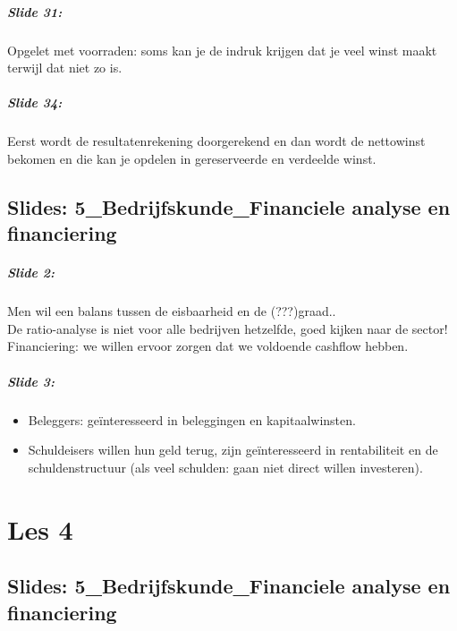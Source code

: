 \documentclass[10pt,a4paper]{report}
\begin{document}
\paragraph{Slide 31:} Opgelet met voorraden: soms kan je de indruk krijgen dat je veel winst maakt terwijl dat niet zo is.

\paragraph{Slide 34:} Eerst wordt de resultatenrekening doorgerekend en dan wordt de nettowinst bekomen en die kan je opdelen in gereserveerde en verdeelde winst.

\section{Slides: 5\_Bedrijfskunde\_Financiele analyse en financiering}

\paragraph{Slide 2:} Men wil een balans tussen de eisbaarheid en de (???)graad..\\
De ratio-analyse is niet voor alle bedrijven hetzelfde, goed kijken naar de sector!\\
Financiering: we willen ervoor zorgen dat we voldoende cashflow hebben.

\paragraph{Slide 3: }
\begin{itemize}
\item Beleggers: ge\"interesseerd in beleggingen en kapitaalwinsten.
\item Schuldeisers willen hun geld terug, zijn ge\"interesseerd in rentabiliteit en de schuldenstructuur (als veel schulden: gaan niet direct willen investeren).
\end{itemize}

\chapter{Les 4}

\section{Slides: 5\_Bedrijfskunde\_Financiele analyse en financiering}
\end{document}
